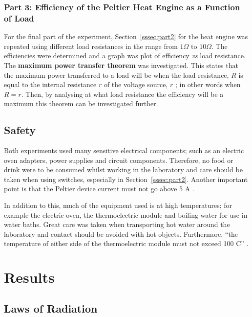 \documentclass{article}
\newcommand{\secref}[2][Section~]{#1\ref{#2}}
\begin{document}
\subsubsection{Part 3: Efficiency of the Peltier Heat Engine as a Function of Load}
\label{sssec:part3}

For the final part of the experiment, \secref{sssec:part2} for the heat engine was repeated using different load resistances in the range from $1 \Omega$ to $10 \Omega$. The efficiencies were determined and a graph was plot of efficiency \textit{vs} load resistance. The \textbf{maximum power transfer theorem} was investigated. This states that the maximum power transferred to a load will be when the load resistance, $R$ is equal to the internal resistance $r$ of the voltage source, $r$ \cite{Paper02}; in other words when $R = r$. Then, by analysing at what load resistance the efficiency will be a maximum this theorem can be investigated further.

\subsection{Safety}
\label{ssec:safety}
Both experiments used many sensitive electrical components; such as an electric oven adapters, power supplies and circuit components. Therefore, no food or drink were to be consumed whilst working in the laboratory and care should be taken when using switches, especially in \secref{sssec:part2}. Another important point is that the Peltier device current must not go above 5 A \cite{Paper02}. 

\vspace{2mm}
\noindent
In addition to this, much of the equipment used is at high temperatures; for example the electric oven, the thermoelectric module and boiling water for use in water baths. Great care was taken when transporting hot water around the laboratory and contact should be avoided with hot objects. Furthermore, ``the temperature of either side of the thermoelectric module must not exceed 100 C'' \cite{Paper01}. 


\section{Results}
\label{sec:results}

\subsection{Laws of Radiation}
\label{ssec:radiation-results}
\end{document}
